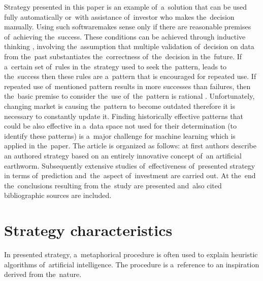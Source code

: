 \documentclass[runningheads,a4paper]{llncs}
\begin{document}
Strategy presented in this paper is an example of~a~solution that can be used fully automatically or~with assistance of~investor who makes the~decision manually. Using such softwaremakes sense only if there are reasonable premises of~achieving the~success. These conditions can be achieved through inductive thinking \cite{provost,KleskWilinski}, involving the~assumption that multiple validation of~decision on data from the~past substantiates the~correctness of~the~decision in the~future. If a~certain set of~rules in the~strategy used to seek the~pattern, leads to the~success then these rules are a~pattern that is encouraged for repeated use. If repeated use of~mentioned pattern results in more successes than failures, then the~basic premise to consider the~use of~the~pattern is rational \cite{bishop2006pattern,KleskWilinski}. Unfortunately, changing market is causing the~pattern to become outdated therefore it is necessary to constantly update it. Finding historically effective patterns that could be also effective in a~data space not used for their determination (to identify these patterns) is a~major challenge for machine learning which is applied in the~paper.
The article is organized as follows: at first authors describe an authored strategy based on an entirely innovative concept of~an artificial earthworm. Subsequently extensive studies of~effectiveness of~presented strategy in terms of~prediction and~the~aspect of~investment are carried out. At the~end the~conclusions resulting from the~study are presented and~also cited bibliographic sources are included.

\section{Strategy characteristics}
In presented strategy, a~metaphorical procedure is often used to explain heuristic algorithms of~artificial intelligence. The procedure is a~reference to an inspiration derived from the~nature.\\
\end{document}
